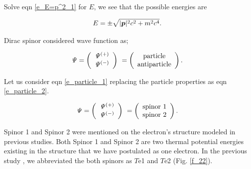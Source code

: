 \documentclass[%
 reprint,
 amsmath,amssymb,
 aps,
]{revtex4-1}
\numberwithin{equation}{section}%
\begin{document}
    Solve eqn \ref{e_E=p^2_1} for $E$, we see that the possible energies are

        \begin{equation}
            E = \pm \sqrt{ |\bm{p}|^{2} c^{2} + m^{2} c^{4} }
            \label{e_E=p^2_2}
            \\.
        \end{equation}

   
    Dirac spinor considered wave function as;


        \begin{align}
            \it\Psi =
                \left( 
                    \begin{array}{c}
                        \it\Psi^{(+)} \\ \it\Psi^{(-)}
                    \end{array}
                \right) \
            =
                \left(
                    \begin{array}{c}
                        \mathrm{particle} \\ \mathrm{antiparticle}
                    \end{array}
                \right)
                .
        \label{e_particle_1}
        \end{align}    

    Let us consider eqn \ref{e_particle_1} replacing the particle properties as eqn \ref{e_particle_2}.

        \begin{align}
            \it\Psi =
                \left( 
                    \begin{array}{c}
                        \it\Psi^{(+)} \\ \it\Psi^{(-)}
                    \end{array}
                \right) \
            =
                \left(
                    \begin{array}{c}
                        \mathrm{spinor \ 1} \\ \mathrm{spinor \ 2}
                    \end{array}
                \right)
                .
        \label{e_particle_2}
        \end{align}    

    Spinor 1 and Spinor 2 were mentioned on the electron's structure modeled in previous studies. Both Spinor 1 and Spinor 2 are two thermal potential energies existing in the structure that we have postulated as one electron. In the previous study \cite{Hanamura1}, we abbreviated the both spinors as $T$e1 and $T$e2 (Fig. \ref{f_22}).
    
\end{document}
